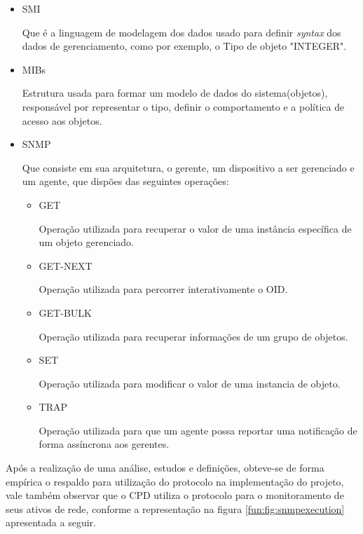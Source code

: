     \begin{itemize}
    \item \acrshort{SMI}
    
    Que é a linguagem de modelagem dos dados usado para definir \textit{syntax} dos dados de gerenciamento, como por exemplo, o Tipo de objeto "INTEGER".
    
    \item \acrshort{MIBs}
    
    Estrutura usada para formar um modelo de dados do sistema(objetos), responsável por representar o tipo, definir o comportamento e a política de acesso aos objetos.
    
    \item \acrshort{SNMP}
    
    Que consiste em sua arquitetura, o gerente, um dispositivo a ser gerenciado e um agente, que dispões das seguintes operações:
    
        \begin{itemize}
        \item GET
        
        Operação utilizada para recuperar o valor de uma instância específica de um objeto gerenciado.
        
        \item GET-NEXT
        
        Operação utilizada para percorrer interativamente o \acrshort{OID}.
        
        \item GET-BULK
        
        Operação utilizada para recuperar informações de um grupo de objetos.
        \item SET
        
        Operação utilizada para modificar o valor de uma instancia de objeto.
        \item TRAP
        
        Operação utilizada para que um agente possa reportar uma notificação de forma assíncrona aos gerentes.
        
        \end{itemize}
        
    \end{itemize}
    
Após a realização de uma análise, estudos e definições, obteve-se de forma empírica o respaldo para utilização do protocolo na implementação do projeto, vale também observar que o \acrshort{CPD} utiliza o protocolo para o monitoramento de seus ativos de rede, conforme a representação na figura \ref{fun:fig:snmpexecution} apresentada a seguir.

